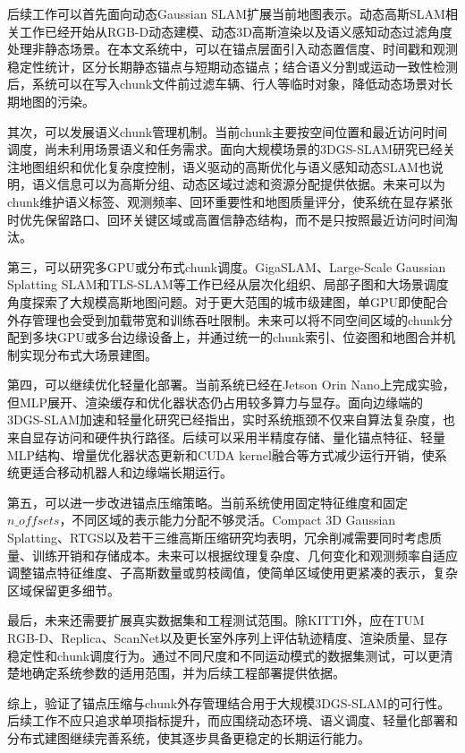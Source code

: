 后续工作可以首先面向动态Gaussian SLAM扩展当前地图表示。动态高斯SLAM相关工作已经开始从RGB-D动态建模、动态3D高斯渲染以及语义感知动态过滤角度处理非静态场景\cite{zhanglanxin2025dynamicrgbd,zhangbin2025dynamic3dgs,wu2026semantic3dgsslam}。在本文系统中，可以在锚点层面引入动态置信度、时间戳和观测稳定性统计，区分长期静态锚点与短期动态锚点；结合语义分割或运动一致性检测后，系统可以在写入chunk文件前过滤车辆、行人等临时对象，降低动态场景对长期地图的污染。

其次，可以发展语义chunk管理机制。当前chunk主要按空间位置和最近访问时间调度，尚未利用场景语义和任务需求。面向大规模场景的3DGS-SLAM研究已经关注地图组织和优化复杂度控制\cite{cheng2025tlsslam}，语义驱动的高斯优化与语义感知动态SLAM也说明，语义信息可以为高斯分组、动态区域过滤和资源分配提供依据\cite{cheng2025rsgslam,wu2026semantic3dgsslam}。未来可以为chunk维护语义标签、观测频率、回环重要性和地图质量评分，使系统在显存紧张时优先保留路口、回环关键区域或高置信静态结构，而不是只按照最近访问时间淘汰。

第三，可以研究多GPU或分布式chunk调度。GigaSLAM、Large-Scale Gaussian Splatting SLAM和TLS-SLAM等工作已经从层次化组织、局部子图和大场景调度角度探索了大规模高斯地图问题\cite{deng2025gigaslam,xin2025largescale,cheng2025tlsslam}。对于更大范围的城市级建图，单GPU即使配合外存管理也会受到加载带宽和训练吞吐限制。未来可以将不同空间区域的chunk分配到多块GPU或多台边缘设备上，并通过统一的chunk索引、位姿图和地图合并机制实现分布式大场景建图。

第四，可以继续优化轻量化部署。当前系统已经在Jetson Orin Nano上完成实验，但MLP展开、渲染缓存和优化器状态仍占用较多算力与显存。面向边缘端的3DGS-SLAM加速和轻量化研究已经指出，实时系统瓶颈不仅来自算法复杂度，也来自显存访问和硬件执行路径\cite{wang2025react3d,huang2026splatonic,wangyuzhe2025lightweight}。后续可以采用半精度存储、量化锚点特征、轻量MLP结构、增量优化器状态更新和CUDA kernel融合等方式减少运行开销，使系统更适合移动机器人和边缘端长期运行。

第五，可以进一步改进锚点压缩策略。当前系统使用固定特征维度和固定$n\_offsets$，不同区域的表示能力分配不够灵活。Compact 3D Gaussian Splatting、RTGS以及若干三维高斯压缩研究均表明，冗余削减需要同时考虑质量、训练开销和存储成本\cite{deng2025compact,li2025rtgs,wangyutong2025maskcompression,hejinxu2025compact3dgs}。未来可以根据纹理复杂度、几何变化和观测频率自适应调整锚点特征维度、子高斯数量或剪枝阈值，使简单区域使用更紧凑的表示，复杂区域保留更多细节。

最后，未来还需要扩展真实数据集和工程测试范围。除KITTI外\cite{Geiger2012CVPR}，应在TUM RGB-D、Replica、ScanNet以及更长室外序列上评估轨迹精度、渲染质量、显存稳定性和chunk调度行为\cite{sturm2012tum,straub2019replica,dai2017scannet}。通过不同尺度和不同运动模式的数据集测试，可以更清楚地确定系统参数的适用范围，并为后续工程部署提供依据。

综上，\ScaffoldChunGS 验证了锚点压缩与chunk外存管理结合用于大规模3DGS-SLAM的可行性。后续工作不应只追求单项指标提升，而应围绕动态环境、语义调度、轻量化部署和分布式建图继续完善系统，使其逐步具备更稳定的长期运行能力。

